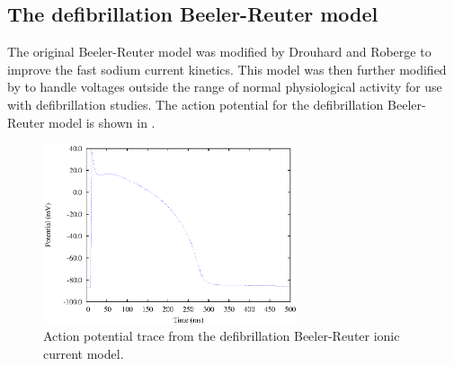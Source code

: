 \subsection{The defibrillation Beeler-Reuter model}
\label{sec:The_defibrillation_Beeler-Reuter_model}
The original Beeler-Reuter model was modified by Drouhard and Roberge
to improve the fast sodium current kinetics. This model was then further
modified by \citet{skouibine:1999} to handle voltages outside the range of normal
physiological activity for use with defibrillation studies. The action
potential for the defibrillation Beeler-Reuter model is shown in
.
\begin{figure}[hbtp] 
  \centering
  \includegraphics[width=75mm]{cardiac_electrophysiology/epsfiles/BRDR_Vm.eps}
  \caption[Defibrillation Beeler-Reuter action potential]{Action potential
    trace from the defibrillation Beeler-Reuter ionic current model.}
  \label{fig:BRDR_ap}
\end{figure}
%
